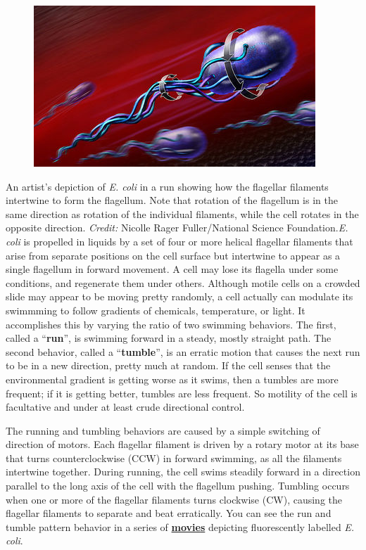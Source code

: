\documentclass{../lab}
\begin{document}
\begin{figure}[h]
    \centering
    \href{http://experimentationlab.berkeley.edu/sites/default/files/images/400px-Ecoli800.jpg}{\includegraphics[width=0.5\linewidth]{images/400px-Ecoli800.jpg}}
    \caption{}
    \label{fig:400px-Ecoli800}
\end{figure}


An artist's depiction of \emph{E. coli} in a run showing how the flagellar filaments intertwine to form the flagellum. Note that rotation of the flagellum is in the same direction as rotation of the individual filaments, while the cell rotates in the opposite direction. \emph{Credit:} Nicolle Rager Fuller/National Science Foundation.\emph{E. coli} is propelled in liquids by a set of four or more helical flagellar filaments that arise from separate positions on the cell surface but intertwine to appear as a single flagellum in forward movement. A cell may lose its flagella under some conditions, and regenerate them under others. Although motile cells on a crowded slide may appear to be moving pretty randomly, a cell actually can modulate its swimmming to follow gradients of chemicals, temperature, or light. It accomplishes this by varying the ratio of two swimming behaviors. The first, called a ``\textbf{run}'', is swimming forward in a steady, mostly straight path. The second behavior, called a ``\textbf{tumble}'', is an erratic motion that causes the next run to be in a new direction, pretty much at random. If the cell senses that the environmental gradient is getting worse as it swims, then a tumbles are more frequent; if it is getting better, tumbles are less frequent. So motility of the cell is facultative and under at least crude directional control.

The running and tumbling behaviors are caused by a simple switching of direction of motors. Each flagellar filament is driven by a rotary motor at its base that turns counterclockwise (CCW) in forward swimming, as all the filaments intertwine together. During running, the cell swims steadily forward in a direction parallel to the long axis of the cell with the flagellum pushing. Tumbling occurs when one or more of the flagellar filaments turns clockwise (CW), causing the flagellar filaments to separate and beat erratically. You can see the run and tumble pattern behavior in a series of \href{http://www.rowland.harvard.edu/labs/bacteria/movies/ecoli.php}{\textbf{movie}}\href{http://www.rowland.harvard.edu/labs/bacteria/movies/ecoli.php}{\textbf{s}} depicting fluorescently labelled \emph{E. coli}.
\end{document}
